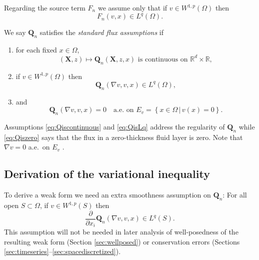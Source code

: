 \documentclass[final,onefignum]{siamart190516}
\newcommand\bQ{\mathbf{Q}}
\newcommand\bX{\mathbf{X}}
\newcommand{\grad}{\nabla}
\newcommand\RR{\mathbb{R}}
\begin{document}
Regarding the source term $F_n$ we assume only that if $v\in W^{1,p}(\Omega)$ then
\begin{equation}
F_n(v,x) \in L^q(\Omega).  \label{eq:FisLq}
\end{equation}

\begin{definition}  \label{ass:std}  We say $\bQ_n$ satisfies the \emph{standard flux assumptions} if
\renewcommand{\labelenumi}{\emph{\roman{enumi}})}
\begin{enumerate}
\item for each fixed $x\in \Omega$,
\begin{equation}
(\bX,z) \mapsto \bQ_n(\bX,z,x) \text{ is continuous on } \RR^d \times \RR,  \label{eq:Qiscontinuous}
\end{equation}
\item if $v \in W^{1,p}(\Omega)$ then
\begin{equation}
\bQ_n(\grad v,v,x) \in L^q(\Omega), \label{eq:QisLq}
\end{equation}
\item and
\begin{equation}
\bQ_n(\grad v,v,x)=0 \quad \text{a.e.~on } E_v = \left\{x\in\Omega\,\big|\,v(x)=0\right\}. \label{eq:Qiszero}
\end{equation}
\end{enumerate}
\end{definition}
Assumptions \eqref{eq:Qiscontinuous} and \eqref{eq:QisLq} address the regularity of $\bQ_n$ while \eqref{eq:Qiszero} says that the flux in a zero-thickness fluid layer is zero.  Note that $\grad v = 0$ a.e.~on $E_v$ \cite[lemma A.4 in chapter II]{KinderlehrerStampacchia1980}.


\subsection{Derivation of the variational inequality}  \label{subsec:derivevi}  To derive a weak form we need an extra smoothness assumption on $\bQ_n$:  For all open $S \subset \Omega$, if $v\in W^{1,p}(S)$ then
\begin{equation}
\frac{\partial}{\partial x_i} \bQ_n(\grad v,v,x) \in L^q(S). \label{eq:Qissmooth}
\end{equation}
This assumption will not be needed in later analysis of well-posedness of the resulting weak form (Section \ref{sec:wellposed}) or conservation errors (Sections \ref{sec:timeseries}--\ref{sec:spacediscretized}).
\end{document}
